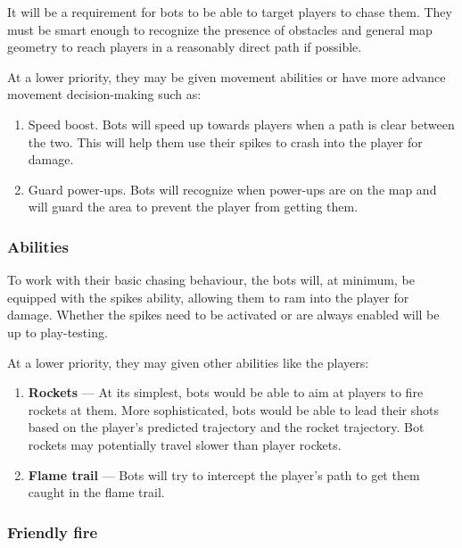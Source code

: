 \documentclass{article}
\theoremstyle{definition}
\begin{document}
It will be a requirement for bots to be able to target players to chase them.
They must be smart enough to recognize the presence of obstacles and general
map geometry to reach players in a reasonably direct path if possible.

At a lower priority, they may be given movement abilities or have more advance
movement decision-making such as:
\begin{enumerate}
  \item Speed boost. Bots will speed up towards players when a path is clear
    between the two. This will help them use their spikes to crash into the
    player for damage.
  \item Guard power-ups. Bots will recognize when power-ups are on the map and
    will guard the area to prevent the player from getting them.
\end{enumerate}

\subsubsection{Abilities}

To work with their basic chasing behaviour, the bots will, at minimum, be
equipped with the spikes ability, allowing them to ram into the player for
damage. Whether the spikes need to be activated or are always enabled will be
up to play-testing.

At a lower priority, they may given other abilities like the players:
\begin{enumerate}
  \item \textbf{Rockets} --- At its simplest, bots would be able to aim at
    players to fire rockets at them. More sophisticated, bots would be able to
    lead their shots based on the player's predicted trajectory and the rocket
    trajectory. Bot rockets may potentially travel slower than player rockets.
  \item \textbf{Flame trail} --- Bots will try to intercept the player's path
    to get them caught in the flame trail.
\end{enumerate}

\subsubsection{Friendly fire}
\end{document}
